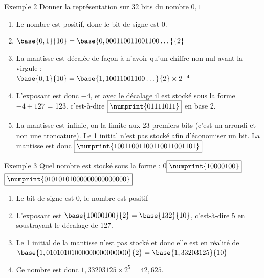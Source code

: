 \documentclass[10pt]{beamer}
\begin{document}
\begin{frame}{\Ctitle}{\stitle}
    \begin{exampleblock}{Exemple 2}
        Donner la représentation sur 32 bits du nombre $0,1$
        \begin{enumerate}
            \item<2-> Le nombre est positif, donc le bit de signe est \textcolor{BrickRed}{$\boxed{0}$}.
            \item<3-> $\base{0,1}{10} = \base{0,000110011001100\dots}{2}$
            \item<4-> La mantisse est décalée de façon à n'avoir qu'un chiffre non nul avant la virgule : \\
            $\base{0,1}{10} = \base{1,10011001100\dots}{2} \times 2^{-4}$
            \item<5-> L'exposant est donc $-4$, et avec le décalage il est stocké sous la forme $-4+127$ = 123. c'est-à-dire \textcolor{blue}{$\boxed{\numprint{01111011}}$} en base 2. 
            \item<6-> La mantisse est infinie, on la limite aux 23 premiers bits (c'est un arrondi et non une troncature). Le 1 initial  n'est pas stocké afin d'économiser un bit. La mantisse est donc \textcolor{OliveGreen}{$\boxed{\numprint{10011001100110011001101}}$}
        \end{enumerate}
    \end{exampleblock}
\end{frame}

\begin{frame}{\Ctitle}{\stitle}
    \begin{exampleblock}{Exemple 3}
        Quel nombre est stocké sous la forme : 
        \textcolor{BrickRed}{$\boxed{0}$}\textcolor{blue}{$\boxed{\numprint{10000100}}$}\textcolor{OliveGreen}{$\boxed{\numprint{01010101000000000000000}}$}
        \begin{enumerate}
            \item<1-> Le bit de signe est 0, le nombre est positif
            \item<2-> L'exposant est $\base{10000100}{2} = \base{132}{10}$, c'est-à-dire 5 en soustrayant le décalage de 127.
            \item<3-> Le 1 initial de la mantisse n'est pas stocké et donc elle est en réalité de $\base{1,01010101000000000000000}{2}=\base{1,33203125}{10}$
            \item<4-> Ce nombre est donc $1,33203125 \times 2^5 = 42,625$.
        \end{enumerate}
    \end{exampleblock}
\end{frame}
\end{document}
